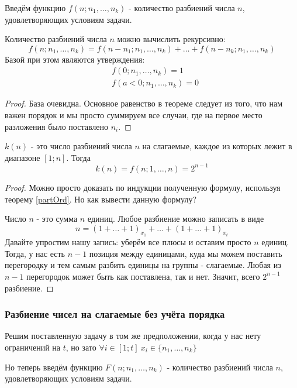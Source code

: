 Введём функцию $f(n; n_1, \ldots, n_k)$ - количество разбиений числа $n$, удовлетворяющих условиям задачи.

\begin{theorem} \label{partOrd}
	Количество разбиений числа $n$ можно вычислить рекурсивно:
	\[
		f(n; n_1, \ldots, n_k) = f(n - n_1; n_1, \ldots, n_k) + \ldots + f(n - n_k; n_1, \ldots, n_k)
	\]
	Базой при этом являются утверждения:
	\begin{align*}
		&f(0; n_1, \ldots, n_k) = 1
		\\
		&f(a < 0; n_1, \ldots, n_k) = 0
	\end{align*}
\end{theorem}

\begin{proof}
	База очевидна. Основное равенство в теореме следует из того, что нам важен порядок и мы просто суммируем все случаи, где на первое место разложения было поставлено $n_i$.
\end{proof}

\begin{corollary}
	$k(n)$ - это число разбиений числа $n$ на слагаемые, каждое из которых лежит в диапазоне $[1; n]$. Тогда
	\[
		k(n) = f(n; 1, \ldots, n) = 2^{n - 1}
	\]
\end{corollary}

\begin{proof}
	Можно просто доказать по индукции полученную формулу, используя теорему \ref{partOrd}. Но как вывести данную формулу?
	
	Число $n$ - это сумма $n$ единиц. Любое разбиение можно записать в виде
	\[
		n = (1 + \ldots + 1)_{x_1} + \ldots + (1 + \ldots + 1)_{x_t}
	\]
	Давайте упростим нашу запись: уберём все плюсы и оставим просто $n$ единиц. Тогда, у нас есть $n - 1$ позиция между единицами, куда мы можем поставить перегородку и тем самым разбить единицы на группы - слагаемые. Любая из $n - 1$ перегородок может быть как поставлена, так и нет. Значит, всего $2^{n - 1}$ разбиение.
\end{proof}

\subsubsection*{Разбиение чисел на слагаемые без учёта порядка}

Решим поставленную задачу в том же предположении, когда у нас нету ограничений на $t$, но зато $\forall i \in [1; t]\ x_i \in \{n_1, \ldots, n_k\}$

Но теперь введём функцию $F(n; n_1, \ldots, n_k)$ - количество разбиений числа $n$, удовлетворяющих условиям задачи.


